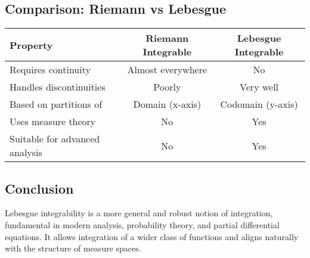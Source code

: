 \subsection*{Comparison: Riemann vs Lebesgue}

\begin{center}
\begin{tabular}{|l|c|c|}
\hline
\textbf{Property} & \textbf{Riemann Integrable} & \textbf{Lebesgue Integrable} \\
\hline
Requires continuity & Almost everywhere & No \\
\hline
Handles discontinuities & Poorly & Very well \\
\hline
Based on partitions of & Domain (x-axis) & Codomain (y-axis) \\
\hline
Uses measure theory & No & Yes \\
\hline
Suitable for advanced analysis & No & Yes \\
\hline
\end{tabular}
\end{center}

\subsection*{Conclusion}

Lebesgue integrability is a more general and robust notion of integration, fundamental in modern analysis, probability theory, and partial differential equations. It allows integration of a wider class of functions and aligns naturally with the structure of measure spaces.
